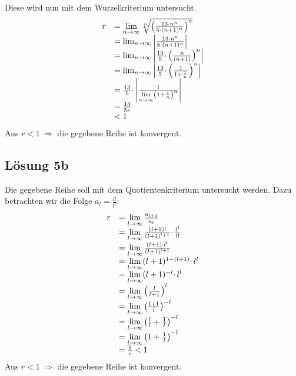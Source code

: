 Diese wird nun mit dem Wurzelkriterium untersucht. 
\begin{equation*}
	\begin{array}{ r l }
		r & =\lim\limits _{n\rightarrow \infty }\sqrt[n]{\left(\frac{13 \cdotp n^{n}}{5 \cdotp ( n+1)^{n}}\right)^{n}}\\
		& =\lim _{n\rightarrow \infty }\left| \frac{13 \cdotp n^{n}}{5 \cdotp ( n+1)^{n}}\right| \\
		& =\lim _{n\rightarrow \infty }\left| \frac{13}{5} \cdotp \left(\frac{n}{( n+1)}\right)^{n}\right| \\
		& =\lim _{n\rightarrow \infty }\left| \frac{13}{5} \cdotp \left(\frac{1}{1+\frac{1}{n}}\right)^{n}\right| \\
		& =\frac{13}{5} \cdotp \left| \frac{1}{\lim\limits _{n\rightarrow \infty }\left( 1+\frac{1}{n}\right)^{n}}\right| \\
		& =\frac{13}{5e}\\
		& < 1
	\end{array}
\end{equation*}
Aus $\displaystyle r< 1\ \Rightarrow $ die gegebene Reihe ist konvergent.



\subsection{Lösung 5b}

Die gegebene Reihe soll mit dem Quotientenkriterium untersucht werden. Dazu betrachten wir die Folge $\displaystyle a_{l} =\frac{l!}{l^{l}}$:
\begin{equation*}
	\begin{array}{ c l }
		r & =\lim\limits _{l\rightarrow \infty }\frac{a_{l+1}}{a_{l}}\\
		& =\lim\limits _{l\rightarrow \infty }\frac{( l+1) !}{( l+1)^{l+1}} \cdotp \frac{l^{l}}{l!}\\
		& =\lim\limits _{l\rightarrow \infty }\frac{( l+1) \cdotp l^{l}}{( l+1)^{l+1}}\\
		& =\lim\limits _{l\rightarrow \infty }( l+1)^{1-( l+1)} \cdotp l^{l}\\
		& =\lim\limits _{l\rightarrow \infty }( l+1)^{-l} \cdotp l^{l}\\
		& =\lim\limits _{l\rightarrow \infty }\left(\frac{l}{l+1}\right)^{l}\\
		& =\lim\limits _{l\rightarrow \infty }\left(\frac{l+1}{l}\right)^{-l}\\
		& =\lim\limits _{l\rightarrow \infty }\left(\frac{l}{l} +\frac{1}{l}\right)^{-l}\\
		& =\lim\limits _{l\rightarrow \infty }\left( 1+\frac{1}{l}\right)^{-l}\\
		& =\frac{1}{e} < 1
	\end{array}
\end{equation*}
Aus $\displaystyle r< 1\ \Rightarrow $ die gegebene Reihe ist konvergent.